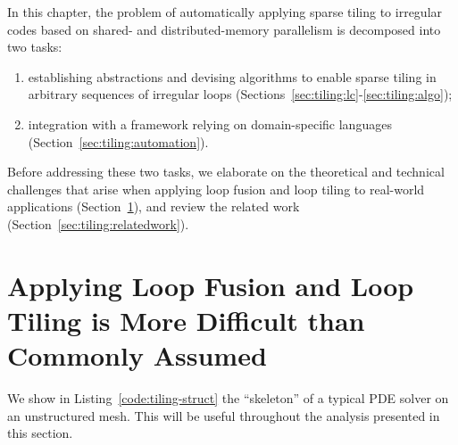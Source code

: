 In this chapter, the problem of automatically applying sparse tiling to irregular codes based on shared- and distributed-memory parallelism is decomposed into two tasks:
\begin{enumerate}
\item establishing abstractions and devising algorithms to enable sparse tiling in arbitrary sequences of irregular loops (Sections~\ref{sec:tiling:lc}-\ref{sec:tiling:algo});
\item integration with a framework relying on domain-specific languages (Section~\ref{sec:tiling:automation}).
\end{enumerate}
Before addressing these two tasks, we elaborate on the theoretical and technical challenges that arise when applying loop fusion and loop tiling to real-world applications (Section~\ref{sec:tiling:difficult}), and review the related work (Section~\ref{sec:tiling:relatedwork}).  



\section{Applying Loop Fusion and Loop Tiling is More Difficult than Commonly Assumed}
\label{sec:tiling:difficult}
We show in Listing~\ref{code:tiling-struct} the ``skeleton'' of a typical PDE solver on an unstructured mesh. This will be useful throughout the analysis presented in this section.


